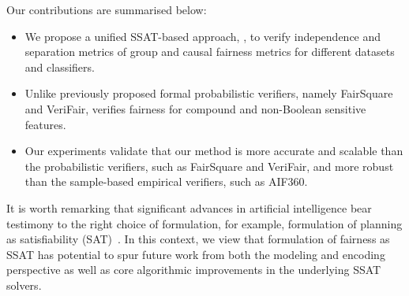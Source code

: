 Our contributions are summarised below:
\begin{itemize}
	\item We propose a unified SSAT-based approach, {\justicia}, to verify independence and separation metrics of group and causal fairness metrics for different datasets and classifiers.
	\item Unlike previously proposed formal probabilistic verifiers, namely FairSquare and VeriFair, {\justicia} verifies fairness for compound and non-Boolean sensitive features.%
	\item Our experiments validate that our method is more accurate and scalable than the probabilistic verifiers, such as FairSquare and VeriFair, and more robust than the sample-based empirical verifiers, such as AIF360.
\end{itemize}

It is worth remarking that significant advances in artificial intelligence bear testimony to the right choice of formulation, for example, formulation of planning as satisfiability (SAT)~\cite{kautz1992planning}. In this context, we view that formulation of fairness as SSAT has potential to spur future work from both the modeling and encoding perspective as well as core algorithmic improvements in the underlying SSAT solvers. 

